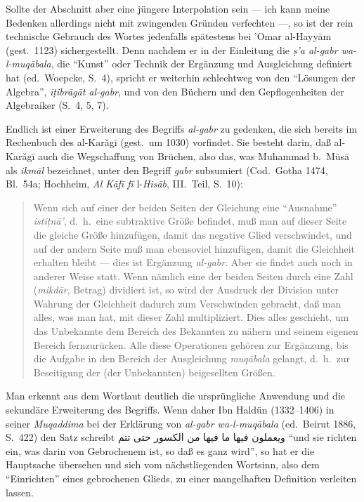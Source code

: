 \documentclass[11pt,a4paper]{article}
\newcommand{\RL}[1]{\beginR#1\endR}
\newcommand{\san}{\d{s}}
\newcommand{\s}[1]{\d{#1}}     %
\newcommand{\ar}[1]{{\arabicfont\RL{#1}}}
\newcommand{\enquote}[1]{``#1''}
\begin{document}
Sollte der Abschnitt aber eine j\"ungere Interpolation sein --- ich kann meine Bedenken allerdings nicht mit zwingenden Gr\"unden verfechten ---, so ist der rein technische Gebrauch des Wortes jedenfalls sp\"atestens bei 'Omar al-Hayy\=am (gest.\ 1123) sichergestellt. Denn nachdem er in der Einleitung die \textit{\san'a al-gabr wa-l-muq\=abala}, die \enquote{Kunst} oder Technik der Erg\"anzung und Ausgleichung definiert hat (ed.\ Woepcke, S.\ 4), spricht er weiterhin schlechtweg von den \enquote{L\"osungen der Algebra}, \textit{i\s{t}ibr\=ag\=at al-gabr}, und von den B\"uchern und den Gepflogenheiten der Algebraiker (S.\ 4, 5, 7).

Endlich ist einer Erweiterung des Begriffs \textit{al-gabr} zu gedenken, die sich bereits im Rechenbuch des al-Kar\v{a}g\=i{} (gest.\ um 1030) vorfindet. Sie besteht darin, da\ss{} al-Kar\v{a}g\=i{} auch die Wegschaffung von Br\"uchen, also das, was Muhammad b.\ M\"us\=a als \textit{ikm\=al} bezeichnet, unter den Begriff \textit{gabr} subsumiert (Cod.\ Gotha 1474, Bl.\ 54a; Hochheim, \textit{Al K\=af\=i f\=i} l-\textit{His\=ab}, III.\ Teil, S.\ 10):

\begin{quote}
Wenn sich auf einer der beiden Seiten der Gleichung eine \enquote{Ausnahme} \textit{isti\d{t}n\=a'}, d.\ h.\ eine subtraktive Gr\"o\ss{}e befindet, mu\ss{} man auf dieser Seite die gleiche Gr\"o\ss{}e hinzuf\"ugen, damit das negative Glied verschwindet, und auf der andern Seite mu\ss{} man ebensoviel hinzuf\"ugen, damit die Gleichheit erhalten bleibt --- dies ist Erg\"anzung \textit{al-gabr}. Aber sie findet auch noch in anderer Weise statt. Wenn n\"amlich eine der beiden Seiten durch eine Zahl (\textit{mikd\=ar}, Betrag) dividiert ist, so wird der Ausdruck der Division unter Wahrung der Gleichheit dadurch zum Verschwinden gebracht, da\ss{} man alles, was man hat, mit dieser Zahl multipliziert. Dies alles geschieht, um das Unbekannte dem Bereich des Bekannten zu n\"ahern und seinem eigenen Bereich fernzur\"ucken. Alle diese Operationen geh\"oren zur Erg\"anzung, bis die Aufgabe in den Bereich der Ausgleichung \textit{muq\=abala} gelangt, d.\ h.\ zur Beseitigung der (der Unbekannten) beigesellten Gr\"o\ss{}en.
\end{quote}

Man erkennt aus dem Wortlaut deutlich die urspr\"ungliche Anwendung und die sekund\"are Erweiterung des Begriffs. Wenn daher Ibn Hald\"un (1332--1406) in seiner \textit{Muqaddima} bei der Erkl\"arung von \textit{al-gabr wa-l-muq\=abala} (ed.\ Beirut 1886, S.\ 422) den Satz schreibt \ar{ويعملون فيها ما فيها من الكسور حتى تتم} \enquote{und sie richten ein, was darin von Gebrochenem ist, so da\ss{} es ganz wird}, so hat er die Hauptsache \"ubersehen und sich vom n\"achstliegenden Wortsinn, also dem \enquote{Einrichten} eines gebrochenen Glieds, zu einer mangelhaften Definition verleiten lassen.
\end{document}

